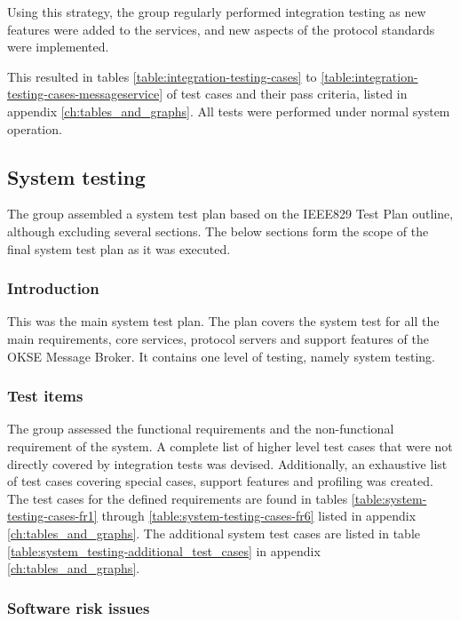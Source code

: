 Using this strategy, the group regularly performed integration testing as new features were added to the services, and new aspects of the protocol standards were implemented.

This resulted in tables \ref{table:integration-testing-cases} to \ref{table:integration-testing-cases-messageservice} of test cases and their pass criteria, listed in appendix \ref{ch:tables_and_graphs}. All tests were performed under normal system operation.

\subsection{System testing}
\label{subsec:testing-test_execution-system_testing}

The group assembled a system test plan based on the IEEE829 Test Plan outline, although excluding several sections. The below sections form the scope of the final system test plan as it was executed.

\subsubsection{Introduction}

This was the main system test plan. The plan covers the system test for all the main requirements, core services, protocol servers and support features of the OKSE Message Broker. It contains one level of testing, namely system testing.

\subsubsection{Test items}

The group assessed the functional requirements and the non-functional requirement of the system. A complete list of higher level test cases that were not directly covered by integration tests was devised. Additionally, an exhaustive list of test cases covering special cases, support features and profiling was created. The test cases for the defined requirements are found in tables \ref{table:system-testing-cases-fr1} through \ref{table:system-testing-cases-fr6} listed in appendix \ref{ch:tables_and_graphs}. The additional system test cases are listed in table \ref{table:system_testing-additional_test_cases} in appendix \ref{ch:tables_and_graphs}.

\subsubsection{Software risk issues}

